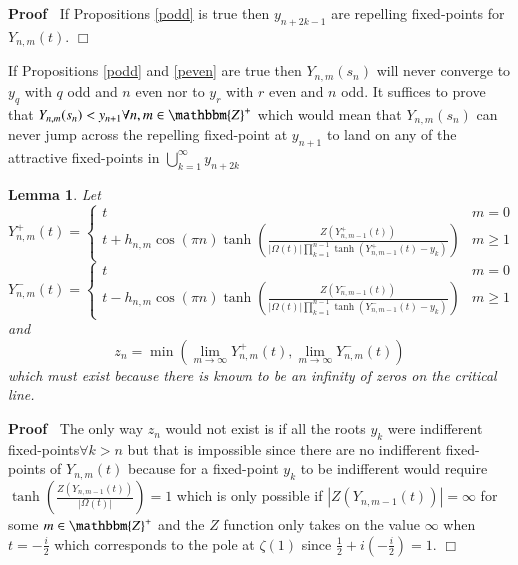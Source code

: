 \documentclass{elsarticle}
\newenvironment{proof}{\noindent\textbf{Proof\ }}{\hspace*{\fill}$\Box$\medskip}
\newtheorem{lemma}{Lemma}
{\theorembodyfont{\rmfamily}\newtheorem{note}{Note}}
\begin{document}
\begin{proof}
  If Propositions \ref{podd} is true then $y_{n + 2 k - 1}$ are repelling
  fixed-points for $Y_{n, m} (t)$.
\end{proof}

\begin{note}
  If Propositions \ref{podd} and \ref{peven} are true then $Y_{n, m} (s_n)$
  will never converge to $y_q$ with $q$ odd and $n$ even nor to $y_r$ with $r$
  even and $n$ odd. It suffices to prove that $Y_{n, m} (s_n) < y_{n + 1}
  \forall n, m \in \mathbbm{Z}^+$ which would mean that $Y_{n, m} (s_n)$ can
  never jump across the repelling fixed-point at $y_{n + 1}$ to land on any of
  the attractive fixed-points in $\bigcup_{k = 1}^{\infty} y_{n + 2 k}$
\end{note}

\begin{lemma}
  Let
  \begin{equation}
    Y^+_{n, m} (t) = \left\{ \begin{array}{ll}
      t & m = 0\\
      t + h_{n, m} \cos (\pi n) \tanh \left( \frac{Z (Y^+_{n, m - 1} (t))}{|
      \Omega (t) | \prod_{k = 1}^{n - 1} \tanh (Y^+_{n, m - 1} (t) - y_k)}
      \right) & m \geqslant 1
    \end{array} \right.
  \end{equation}
  \begin{equation}
    Y^-_{n, m} (t) = \left\{ \begin{array}{ll}
      t & m = 0\\
      t - h_{n, m} \cos (\pi n) \tanh \left( \frac{Z (Y^-_{n, m - 1} (t))}{|
      \Omega (t) | \prod_{k = 1}^{n - 1} \tanh (Y^-_{n, m - 1} (t) - y_k)}
      \right) & m \geqslant 1
    \end{array} \right.
  \end{equation}
  and
  \begin{equation}
    z_n = \min (\lim_{m \rightarrow \infty} Y^+_{n, m} (t), \lim_{m
    \rightarrow \infty} Y^-_{n, m} (t))
  \end{equation}
  which must exist because there is known to be an infinity of zeros on the
  critical line. 
\end{lemma}

\begin{proof}
  The only way $z_n$ would not exist is if all the roots $y_k$ were
  indifferent fixed-points$\forall k > n$ but that is impossible since there
  are no indifferent fixed-points of $Y_{n, m} (t)$ because for a fixed-point
  $y_k$ to be indifferent would require $\tanh \left( \frac{Z (Y_{n, m - 1}
  (t))}{| \Omega (t) |} \right) = 1$ which is only possible if $| Z (Y_{n, m -
  1} (t)) | = \infty$ for some $m \in \mathbbm{Z}^+$ and the $Z$ function only
  takes on the value $\infty$ when $t = - \frac{i}{2}$ which corresponds to
  the pole at $\zeta (1)$ since $\frac{1}{2} + i \left( - \frac{i}{2} \right)
  = 1$.
\end{proof}
\end{document}
